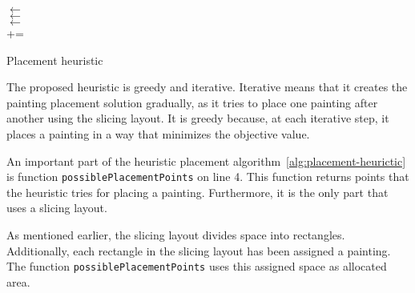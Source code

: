 \begin{algorithm}[H]
    \SetAlgoLined
    \LinesNumbered





    \KwData{\SlicingLayout, \Paintings}
     \BlankLine


    \PlacedPaintings $\leftarrow$ \EmptyList \\

     {
        \Best $\leftarrow$ \Nil \\
         {
            \PlacedPainting $\leftarrow$ \\
            \If{\Best == \Nil \Or \Objective{\PlacedPainting} <  \Objective{\Best}}{
                \Best $\leftarrow$ \PlacedPainting
            }
        }
        \PlacedPaintings += \Best
    }

    \KwRet{\PlacedPaintings}

    \caption{Placement heuristic}\label{alg:placement-heurictic}
\end{algorithm}

The proposed heuristic is greedy and iterative.
Iterative means that it creates the painting placement solution gradually, as it
tries to place one painting after another using the slicing layout.
It is greedy because, at each iterative step, it places a painting in a way that minimizes the objective value.

An important part of the heuristic placement algorithm~\ref{alg:placement-heurictic}
is function \verb|possiblePlacementPoints| on line 4.
This function returns points that the heuristic tries for placing a painting.
Furthermore, it is the only part that uses a slicing layout.

As mentioned earlier, the slicing layout divides space into rectangles.
Additionally, each rectangle in the slicing layout has been assigned a painting.
The function \verb|possiblePlacementPoints| uses this assigned space as allocated area.\\

